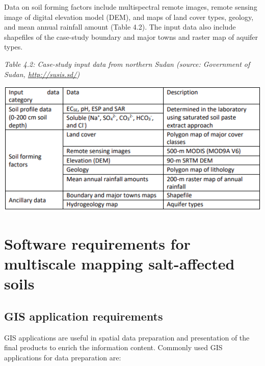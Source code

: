 \documentclass[
  10pt,
  b5paper,
]{book}
\begin{document}
Data on soil forming factors include multispectral remote images, remote sensing image of digital elevation model (DEM), and maps of land cover types, geology, and mean annual rainfall amount (Table 4.2). The input data also include shapefiles of the case-study boundary and major towns and raster map of aquifer types.

\emph{Table 4.2: Case-study input data from northern Sudan (source: Government of Sudan, \url{http://susis.sd/})}

\includegraphics{figures/tables/Table_4.2.png}

\hypertarget{software-requirements-for-multiscale-mapping-salt-affected-soils}{%
\section{Software requirements for multiscale mapping salt-affected soils}\label{software-requirements-for-multiscale-mapping-salt-affected-soils}}

\hypertarget{gis-application-requirements}{%
\subsection{GIS application requirements}\label{gis-application-requirements}}

GIS applications are useful in spatial data preparation and presentation of the final products to enrich the information content. Commonly used GIS applications for data preparation are:
\end{document}
